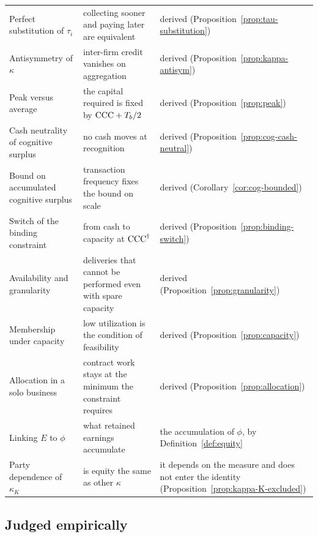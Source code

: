\begin{longtable}{@{}>{\raggedright\arraybackslash}p{}>{\raggedright\arraybackslash}p{}>{\raggedright\arraybackslash}p{}@{}}
Perfect substitution of $\tau_i$ & collecting sooner and paying later are equivalent & derived (Proposition~\ref{prop:tau-substitution}) \\
Antisymmetry of $\kappa$ & inter-firm credit vanishes on aggregation & derived (Proposition~\ref{prop:kappa-antisym}) \\
Peak versus average & the capital required is fixed by $\mathrm{CCC}+T_b/2$ & derived (Proposition~\ref{prop:peak}) \\
Cash neutrality of cognitive surplus & no cash moves at recognition & derived (Proposition~\ref{prop:cog-cash-neutral}) \\
Bound on accumulated cognitive surplus & transaction frequency fixes the bound on scale & derived (Corollary~\ref{cor:cog-bounded}) \\
Switch of the binding constraint & from cash to capacity at $\mathrm{CCC}^{\dagger}$ & derived (Proposition~\ref{prop:binding-switch}) \\
Availability and granularity & deliveries that cannot be performed even with spare capacity & derived (Proposition~\ref{prop:granularity}) \\
Membership under capacity & low utilization is the condition of feasibility & derived (Proposition~\ref{prop:capacity}) \\
Allocation in a solo business & contract work stays at the minimum the constraint requires & derived (Proposition~\ref{prop:allocation}) \\
Linking $E$ to $\phi$ & what retained earnings accumulate & the accumulation of $\phi$, by Definition~\ref{def:equity} \\
Party dependence of $\kappa_K$ & is equity the same as other $\kappa$ & it depends on the measure and does not enter the identity (Proposition~\ref{prop:kappa-K-excluded}) \\
\end{longtable}

\subsection{Judged empirically}

